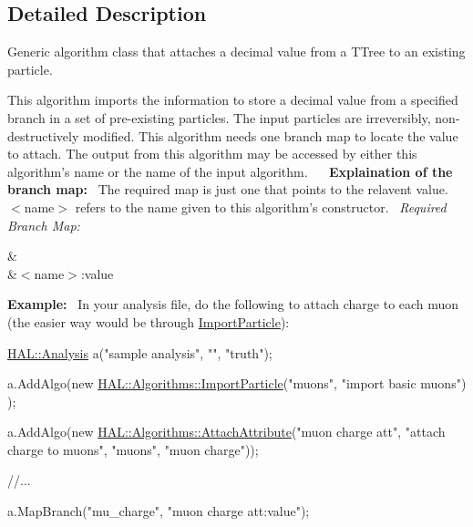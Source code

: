 \subsection{Detailed Description}
Generic algorithm class that attaches a decimal value from a T\+Tree to an existing particle. 

This algorithm imports the information to store a decimal value from a specified branch in a set of pre-\/existing particles. The input particles are irreversibly, non-\/destructively modified. This algorithm needs one branch map to locate the value to attach. The output from this algorithm may be accessed by either this algorithm's name or the name of the input algorithm.~\newline
~\newline
{\bfseries Explaination of the branch map\+:}~\newline
The required map is just one that points to the relavent value. $<$name$>$ refers to the name given to this algorithm's constructor.~\newline
{\itshape Required Branch Map\+:} \begin{TabularC}{2}
\hline
{}&\PBS{}\\
&\PBS\centering $<$name$>$\+:value \\
\end{TabularC}
{\bfseries Example\+:}~\newline
In your analysis file, do the following to attach charge to each muon (the easier way would be through \hyperlink{class_h_a_l_1_1_algorithms_1_1_import_particle}{Import\+Particle})\+:


\begin{DoxyCode}
\hyperlink{class_h_a_l_1_1_analysis}{HAL::Analysis} a(\textcolor{stringliteral}{"sample analysis"}, \textcolor{stringliteral}{""}, \textcolor{stringliteral}{"truth"});

a.AddAlgo(\textcolor{keyword}{new} \hyperlink{class_h_a_l_1_1_algorithms_1_1_import_particle}{HAL::Algorithms::ImportParticle}(\textcolor{stringliteral}{"muons"}, \textcolor{stringliteral}{"import basic muons"})
      );

a.AddAlgo(\textcolor{keyword}{new} \hyperlink{class_h_a_l_1_1_algorithms_1_1_attach_attribute}{HAL::Algorithms::AttachAttribute}(\textcolor{stringliteral}{"muon charge att"}, \textcolor{stringliteral}{"attach
       charge to muons"}, 
                                               \textcolor{stringliteral}{"muons"}, 
                                               \textcolor{stringliteral}{"muon charge"}));

\textcolor{comment}{//...}

a.MapBranch(\textcolor{stringliteral}{"mu\_charge"}, \textcolor{stringliteral}{"muon charge att:value"});
\end{DoxyCode}
 


